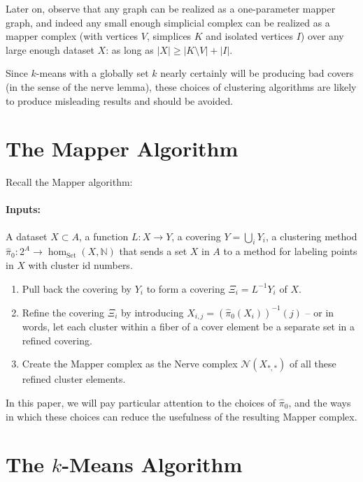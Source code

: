 \documentclass{amsart}
\begin{document}
Later on, \cite{alvarado2024graphmappergraph} observe that any graph can be realized as a one-parameter mapper graph, and indeed any small enough simplicial complex can be realized as a mapper complex (with vertices $V$, simplices $K$ and isolated vertices $I$) over any large enough dataset $X$: as long as $|X| \geq |K\setminus V| + |I|$.

Since $k$-means with a globally set $k$ nearly certainly will be producing bad covers (in the sense of the nerve lemma), these choices of clustering algorithms are likely to produce misleading results and should be avoided.


\section{The Mapper Algorithm}

Recall the Mapper algorithm:

\paragraph*{Inputs:} A dataset $X\subset A$, a function $L:X\to Y$, a covering $Y = \bigcup_i Y_i$, a clustering method $\hat\pi_0:2^A\to \hom_{\textrm{Set}}(X, \mathbb{N})$ that sends a set $X$ in $A$ to a method for labeling points in $X$ with cluster id numbers.

\begin{enumerate}
    \item Pull back the covering by $Y_i$ to form a covering $\Xi_i = L^{-1}Y_i$ of $X$.
    \item Refine the covering $\Xi_i$ by introducing $X_{i,j}=(\hat\pi_0(X_i))^{-1}(j)$ -- or in words, let each cluster within a fiber of a cover element be a separate set in a refined covering.
    \item Create the Mapper complex as the Nerve complex $\mathcal{N}(X_{\ast,\ast})$ of all these refined cluster elements. 
\end{enumerate}

In this paper, we will pay particular attention to the choices of $\hat\pi_0$, and the ways in which these choices can reduce the usefulness of the resulting Mapper complex.

\section{The $k$-Means Algorithm}
\end{document}
